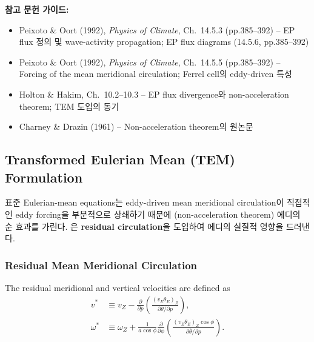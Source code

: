 

\begin{hisublock}
\textbf{참고 문헌 가이드:}
\begin{itemize}
  \item Peixoto \& Oort (1992), \textit{Physics of Climate}, Ch.~14.5.3 (pp.385--392) -- EP flux 정의 및 wave-activity propagation; EP flux diagrams (14.5.6, pp.385--392) 
  \item Peixoto \& Oort (1992), \textit{Physics of Climate}, Ch.~14.5.5 (pp.385--392) -- Forcing of the mean meridional circulation; Ferrel cell의 eddy-driven 특성 
  \item Holton \& Hakim, Ch.~10.2--10.3 -- EP flux divergence와 non-acceleration theorem; TEM 도입의 동기
  \item Charney \& Drazin (1961) -- Non-acceleration theorem의 원논문
\end{itemize}
\end{hisublock}


\subsection{Transformed Eulerian Mean (TEM) Formulation}

표준 Eulerian-mean equations는 eddy-driven mean meridional circulation이
직접적인 eddy forcing을 부분적으로 상쇄하기 때문에 (non-acceleration theorem)
에디의 순 효과를 가린다.  은
\textbf{residual circulation}을 도입하여 에디의 실질적 영향을 드러낸다.

\subsubsection{Residual Mean Meridional Circulation}

\begin{definition}
The residual meridional and vertical velocities are defined as
\begin{align}
  v^* &\equiv v_Z - \frac{\partial}{\partial p}
    \left(\frac{(v_E\theta_E)_Z}{\partial\bar{\theta}/\partial p}\right),
  \label{eq:vstar}\\[4pt]
  \omega^* &\equiv \omega_Z + \frac{1}{a\cos\phi}
    \frac{\partial}{\partial\phi}
    \left(\frac{(v_E\theta_E)_Z\cos\phi}{\partial\bar{\theta}/\partial p}\right).
  \label{eq:omegastar}
\end{align}
\end{definition}

